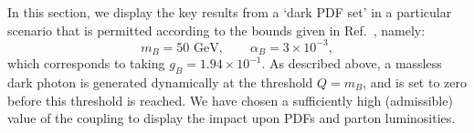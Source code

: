 \documentclass[withindex,glossary]{cam-thesis}
\begin{document}
In this section, we display the key
results from a `dark PDF set' in a particular scenario
that is permitted according to the bounds given in
Ref.~\cite{Ilten:2018crw}, namely:
\begin{equation}
  \label{eq:value}
  m_B = 50\,\, \text{GeV}, \qquad \alpha_B = 3 \times 10^{-3},
\end{equation}
which corresponds to taking $g_B = 1.94 \times 10^{-1}$. As described
above, a massless dark photon is generated dynamically at the threshold $Q = m_B$, and is set
to zero before this threshold is reached. We have chosen a sufficiently
high (admissible) value of the coupling to display the impact
upon PDFs and parton luminosities. 
%
\end{document}
